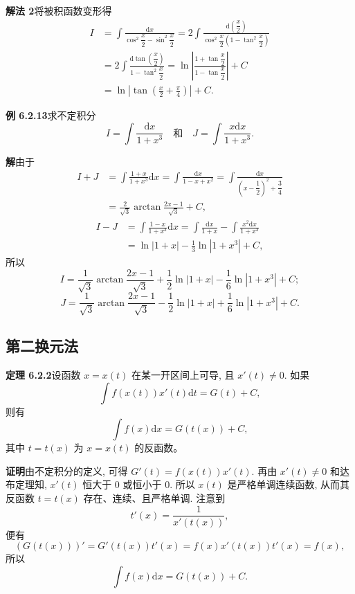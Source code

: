 \documentclass[UTF8, 12pt, fontset=fandol, oneside]{ctexart}
\begin{document}
\noindent\textbf{解法 2}\quad 将被积函数变形得
\[
\begin{aligned}
  I
  &=
  \int\frac{\mathrm dx}{\cos^2\dfrac x2-\sin^2\dfrac x2}
  =
  2\int\frac{\mathrm d\left(\dfrac x2\right)}
  {\cos^2\dfrac x2\left(1-\tan^2\dfrac x2\right)}\\
  &=
  2\int\frac{\mathrm d\tan\left(\dfrac x2\right)}
  {1-\tan^2\dfrac x2}
  =
  \ln\left|\frac{1+\tan\dfrac x2}{1-\tan\dfrac x2}\right|+C\\
  &=
  \ln\left|\tan\left(\frac x2+\frac\pi4\right)\right|+C.
\end{aligned}
\]

\noindent\textbf{例 6.2.13}\quad 求不定积分
\[
  I=\int\frac{\mathrm dx}{1+x^3}
  \quad\text{和}\quad
  J=\int\frac{x\mathrm dx}{1+x^3}.
\]

\noindent\textbf{解}\quad 由于
\[
\begin{aligned}
  I+J
  &=
  \int\frac{1+x}{1+x^3}\mathrm dx
  =
  \int\frac{\mathrm dx}{1-x+x^2}
  =
  \int\frac{\mathrm dx}{\left(x-\dfrac12\right)^2+\dfrac34}\\
  &=
  \frac2{\sqrt3}\arctan\frac{2x-1}{\sqrt3}+C,
\end{aligned}
\]
\[
\begin{aligned}
  I-J
  &=
  \int\frac{1-x}{1+x^3}\mathrm dx
  =
  \int\frac{\mathrm dx}{1+x}
  -
  \int\frac{x^2\mathrm dx}{1+x^3}\\
  &=
  \ln|1+x|-\frac13\ln|1+x^3|+C,
\end{aligned}
\]
所以
\[
  I=
  \frac1{\sqrt3}\arctan\frac{2x-1}{\sqrt3}
  +
  \frac12\ln|1+x|-\frac16\ln|1+x^3|+C;
\]
\[
  J=
  \frac1{\sqrt3}\arctan\frac{2x-1}{\sqrt3}
  -
  \frac12\ln|1+x|+\frac16\ln|1+x^3|+C.
\]

\subsection{第二换元法}

\noindent\textbf{定理 6.2.2}\quad 设函数 $x=x(t)$ 在某一开区间上可导, 且 $x'(t)\ne0$. 如果
\[
  \int f(x(t))x'(t)\mathrm dt=G(t)+C,
\]
则有
\[
  \int f(x)\mathrm dx=G(t(x))+C,
\]
其中 $t=t(x)$ 为 $x=x(t)$ 的反函数。

\noindent\textbf{证明}\quad 由不定积分的定义, 可得 $G'(t)=f(x(t))x'(t)$. 再由 $x'(t)\ne0$ 和达布定理知, $x'(t)$ 恒大于 $0$ 或恒小于 $0$. 所以 $x(t)$ 是严格单调连续函数, 从而其反函数 $t=t(x)$ 存在、连续、且严格单调. 注意到
\[
  t'(x)=\frac1{x'(t(x))},
\]
便有
\[
  (G(t(x)))'=G'(t(x))t'(x)=f(x)x'(t(x))t'(x)=f(x),
\]
所以
\[
  \int f(x)\mathrm dx=G(t(x))+C.
\]
\end{document}
